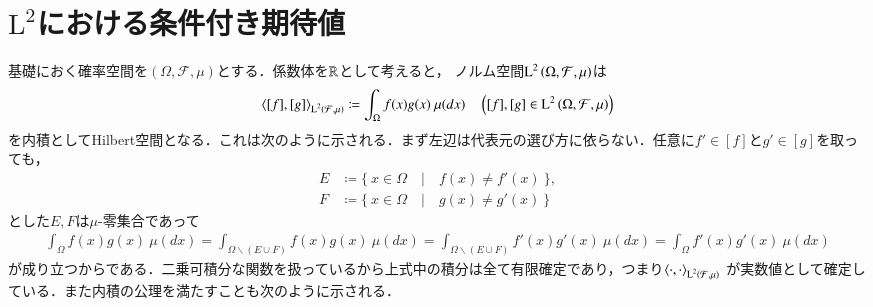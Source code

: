 \section{$\mathrm{L}^2$における条件付き期待値}
	基礎におく確率空間を$(\Omega,\mathcal{F},\mu)$とする．係数体を$\mathbb{R}$として考えると，
	ノルム空間$\operatorname{L}^{2} \left(\Omega,\mathcal{F},\mu\right)$は
	\begin{align}
		\inprod<[f],[g]>_{\Lp{2}{\mathcal{F},\mu}} \coloneqq \int_{\Omega} f(x)g(x)\ \mu(dx) \quad \left( [f],[g] \in \Lp{2}{\Omega,\mathcal{F},\mu} \right)
	\end{align}
	を内積としてHilbert空間となる．これは次のように示される．まず左辺は代表元の選び方に依らない．任意に$f' \in [f]$と$g' \in [g]$を取っても，
	\begin{align}
		E &\coloneqq \{\ x \in \Omega\quad |\quad f(x) \neq f'(x)\ \}, \\
		F &\coloneqq \{\ x \in \Omega\quad |\quad g(x) \neq g'(x)\ \}
	\end{align}
	とした$E,F$は$\mu$-零集合であって
	\begin{align}
		\int_{\Omega} f(x)g(x)\ \mu(dx) = \int_{\Omega \backslash (E \cup F)} f(x)g(x)\ \mu(dx)
		= \int_{\Omega \backslash (E \cup F)} f'(x)g'(x)\ \mu(dx) = \int_{\Omega} f'(x)g'(x)\ \mu(dx)
	\end{align}
	が成り立つからである．二乗可積分な関数を扱っているから上式中の積分は全て有限確定であり，つまり$\inprod<\cdot,\cdot>_{\Lp{2}{\mathcal{F},\mu}}$
	が実数値として確定している．また内積の公理を満たすことも次のように示される．
